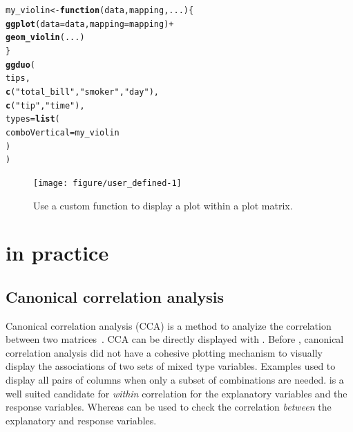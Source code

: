 \documentclass[stat,dissertation]{puthesis}\usepackage[]{graphicx}\usepackage{xcolor}
\makeatletter
\newcommand{\hlstr}[1]{\textcolor[rgb]{0.192,0.494,0.8}{#1}}%
\newcommand{\hlopt}[1]{\textcolor[rgb]{0,0,0}{#1}}%
\newcommand{\hlstd}[1]{\textcolor[rgb]{0.345,0.345,0.345}{#1}}%
\newcommand{\hlkwa}[1]{\textcolor[rgb]{0.161,0.373,0.58}{\textbf{#1}}}%
\newcommand{\hlkwb}[1]{\textcolor[rgb]{0.69,0.353,0.396}{#1}}%
\newcommand{\hlkwc}[1]{\textcolor[rgb]{0.333,0.667,0.333}{#1}}%
\newcommand{\hlkwd}[1]{\textcolor[rgb]{0.737,0.353,0.396}{\textbf{#1}}}%
\newenvironment{kframe}{%
 \def\at@end@of@kframe{}%
 \ifinner\ifhmode%
  \def\at@end@of@kframe{\end{minipage}}%
  \begin{minipage}{\columnwidth}%
 \fi\fi%
 \def\FrameCommand##1{\hskip\@totalleftmargin \hskip-\fboxsep
 \colorbox{shadecolor}{##1}\hskip-\fboxsep
     \hskip-\linewidth \hskip-\@totalleftmargin \hskip\columnwidth}%
 \MakeFramed {\advance\hsize-\width
   \@totalleftmargin\z@ \linewidth\hsize
   \@setminipage}}%
 {\par\unskip\endMakeFramed%
 \at@end@of@kframe}
\newenvironment{knitrout}{}{} %
\renewenvironment{knitrout}{\setstretch{1}}{}
\makeatother
\begin{document}
\begin{knitrout}\small
{}\color{fgcolor}\begin{kframe}
\begin{alltt}
\hlstd{my_violin} \hlkwb{<-} \hlkwa{function}\hlstd{(}\hlkwc{data}\hlstd{,} \hlkwc{mapping}\hlstd{,} \hlkwc{...}\hlstd{) \{}
  \hlkwd{ggplot}\hlstd{(}\hlkwc{data} \hlstd{= data,} \hlkwc{mapping} \hlstd{= mapping)} \hlopt{+}
    \hlkwd{geom_violin}\hlstd{(...)}
\hlstd{\}}
\hlkwd{ggduo}\hlstd{(}
  \hlstd{tips,}
  \hlkwd{c}\hlstd{(}\hlstr{"total_bill"}\hlstd{,} \hlstr{"smoker"}\hlstd{,} \hlstr{"day"}\hlstd{),}
  \hlkwd{c}\hlstd{(}\hlstr{"tip"}\hlstd{,} \hlstr{"time"}\hlstd{),}
  \hlkwc{types} \hlstd{=} \hlkwd{list}\hlstd{(}
    \hlkwc{comboVertical} \hlstd{= my_violin}
  \hlstd{)}
\hlstd{)}
\end{alltt}
\end{kframe}\begin{figure}[H]

{\centering \texttt{[image: figure/user\_defined-1]} 

}

\caption{Use a custom function to display a plot within a  plot matrix.}\label{fig:user_defined}
\end{figure}


\end{knitrout}



\section{ in practice}



\subsection{Canonical correlation analysis}

Canonical correlation analysis (CCA) is a method to analyize the correlation between two matrices~\cite{hotelling36cca}.  CCA can be directly displayed with .  Before , canonical correlation analysis did not have a cohesive plotting mechanism to visually display the associations of two sets of mixed type variables.  Examples used  to display all pairs of columns when only a subset of combinations are needed.   is a well suited candidate for \emph{within} correlation for the explanatory variables and the response variables.  Whereas  can be used to check the correlation \emph{between} the explanatory and response variables.
\end{document}
